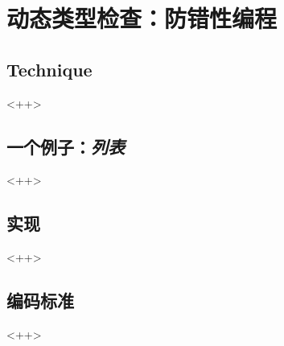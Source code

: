 

\chapter{动态类型检查：防错性编程}
\label{ch:DynamicTypeChecking}

\section{Technique}<++>

\section{一个例子：\emph{列表}}<++>

\section{实现}<++>

\section{编码标准}<++>

